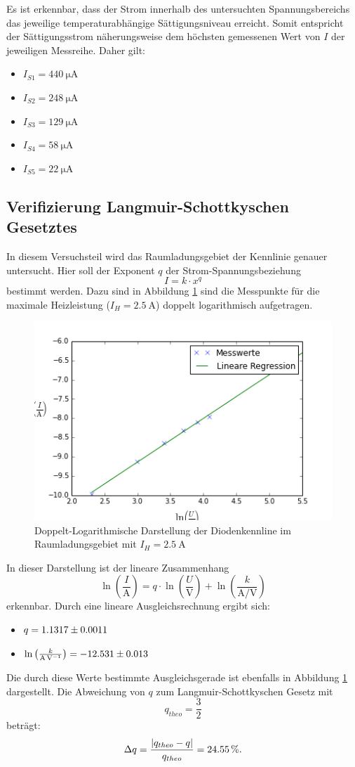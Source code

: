 \documentclass[11pt,ngerman,a4paper]{article}
\begin{document}
\noindent
Es ist erkennbar, dass der Strom innerhalb des untersuchten Spannungsbereichs das jeweilige temperaturabhängige Sättigungsniveau erreicht. Somit entspricht der Sättigungsstrom näherungsweise dem höchsten gemessenen Wert von $I$ der jeweiligen Messreihe. Daher gilt:
\begin{itemize}
\item $I_{S1} = \SI{440}{\micro\ampere}$
\item $I_{S2} = \SI{248}{\micro\ampere}$
\item $I_{S3} = \SI{129}{\micro\ampere}$
\item $I_{S4} = \SI{58}{\micro\ampere}$
\item $I_{S5} = \SI{22}{\micro\ampere}$
\end{itemize}

\subsection{Verifizierung Langmuir-Schottkyschen Gesetztes}
In diesem Versuchsteil wird das Raumladungsgebiet der Kennlinie genauer untersucht.
Hier soll der Exponent $q$ der Strom-Spannungsbeziehung 
\[
I = k\cdot x^q
\]
bestimmt werden. Dazu sind in Abbildung \ref{plot_b} sind die Messpunkte für die maximale Heizleistung ($I_H = \SI{2.5}{\ampere}$) doppelt logarithmisch aufgetragen.

\begin{figure}[htp]
\centering
\includegraphics[scale=0.80]{plot_b.png}
\caption{Doppelt-Logarithmische Darstellung der Diodenkennline im Raumladungsgebiet mit $I_H = \SI{2.5}{\ampere}$}
\label{plot_b}
\end{figure}

\noindent
In dieser Darstellung ist der lineare Zusammenhang
\[
\ln\left(\frac{I}{\si{\ampere}}\right) = q\cdot \ln\left(\frac{U}{\si{\volt}}\right)+ \ln\left(\frac{k}{\si{\ampere\per\volt}}\right)
\]
erkennbar. Durch eine lineare Ausgleichsrechnung ergibt sich:
\begin{itemize}
\item $q = \num{1.1317+-0.0011}$
\item $\ln\left(\frac{k}{\si{\ampere\per\volt}}\right) = \num{-12.531+-0.013}$ 
\end{itemize}
Die durch diese Werte bestimmte Ausgleichsgerade ist ebenfalls in Abbildung \ref{plot_b} dargestellt.
Die Abweichung von $q$ zum Langmuir-Schottkyschen Gesetz mit 
\[
q_{theo} = \frac32
\]
beträgt:
\[
\Delta q = \frac{|q_{theo}-q|}{q_{theo}} = \SI{24.55}{\percent}\rm.
\]
\end{document}
